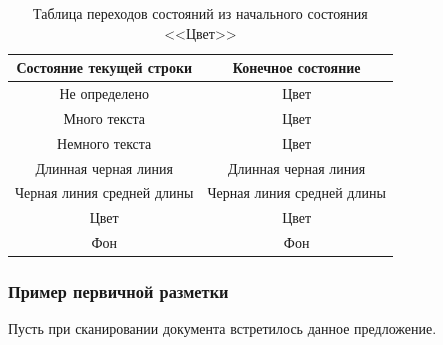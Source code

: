 \begin{table}[H]
    \centering
    \caption{Таблица переходов состояний из начального состояния <<Цвет>>}
    \label{tab:color}
    \begin{tabular}{|c|c|}
        \hline
        \textbf{Состояние текущей строки} & \textbf{Конечное состояние} \\ \hline
        Не определено & Цвет \\ \hline
        Много текста & Цвет \\ \hline
        Немного текста & Цвет \\ \hline
        Длинная черная линия & Длинная черная линия \\ \hline
        Черная линия средней длины & Черная линия средней длины \\ \hline
        Цвет & Цвет \\ \hline
        Фон & Фон \\ \hline
    \end{tabular}
\end{table}

\subsubsection*{Пример первичной разметки}

Пусть при сканировании документа встретилось данное предложение.

